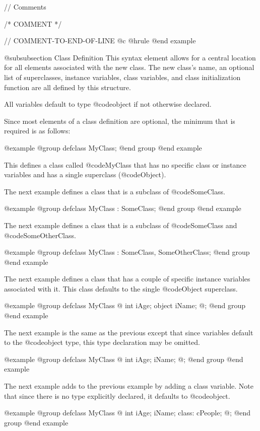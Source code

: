 //  Comments

/*  COMMENT  */

//  COMMENT-TO-END-OF-LINE
@c @hrule
@end example

@subsubsection Class Definition
This syntax element allows for a central location for all elements
associated with the new class.  The new class's name, an optional
list of superclasses, instance variables, class variables, and
class initialization function are all defined by this structure.

All variables default to type @code{object} if not otherwise
declared.

Since most elements of a class definition are optional, the minimum
that is required is as follows:

@example
@group
defclass   MyClass;
@end group
@end example


This defines a class called @code{MyClass} that has no specific class
or instance variables and has a single superclass (@code{Object}).

The next example defines a class that is a subclass of @code{SomeClass}.

@example
@group
defclass   MyClass : SomeClass;
@end group
@end example


The next example defines a class that is a subclass of @code{SomeClass}
and @code{SomeOtherClass}.

@example
@group
defclass   MyClass : SomeClass, SomeOtherClass;
@end group
@end example


The next example defines a class that has a couple of specific
instance variables associated with it.  This class defaults to
the single @code{Object} superclass.

@example
@group
defclass   MyClass  @{
        int     iAge;
        object  iName;
@};
@end group
@end example

The next example is the same as the previous except that since
variables default to the @code{object} type, this type declaration
may be omitted.

@example
@group
defclass   MyClass  @{
        int     iAge;
        iName;
@};
@end group
@end example


The next example adds to the previous example by adding a class variable.
Note that since there is no type explicitly declared, it defaults to
@code{object}.

@example
@group
defclass   MyClass  @{
        int     iAge;
        iName;
 class:
        cPeople;
@};
@end group
@end example


